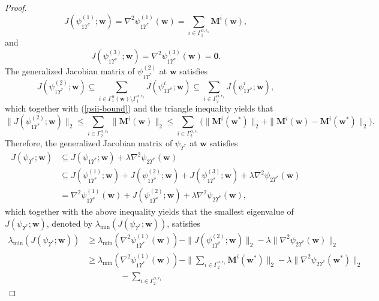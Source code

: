 \documentclass{article}
\numberwithin{equation}{section}
\begin{document}
\begin{proof}
$$J(\psi_{1\Upsilon^*}^{(1)};\mathbf{w})=\nabla^2\psi_{1\Upsilon^*}^{(1)}(\mathbf{w})=
\sum_{i\in\Gamma_1^{\alpha,\epsilon_1}}
\mathbf{M}^i(\mathbf{w}),$$ and $$ J(\psi_{1\Upsilon^*}^{(3)};\mathbf{w})=\nabla^2\psi_{1\Upsilon^*}^{(3)}(\mathbf{w})=\mathbf{0}.$$
The generalized Jacobian  matrix of $\psi_{1\Upsilon^*}^{(2)}$ at $\mathbf{w}$ satisfies
$$J(\psi_{1\Upsilon^*}^{(2)};\mathbf{w})\subseteq
\sum_{i\in\Gamma_1^{\alpha}(\mathbf{w})\setminus\Gamma_1^{\alpha,\epsilon_1}}
J(\psi_{1\Upsilon^*}^{i};\mathbf{w})\subseteq
\sum_{i\in\Gamma_2^{\alpha,\epsilon_1}}
J(\psi_{1\Upsilon^*}^{i};\mathbf{w}),$$
which together with (\ref{psii-bound}) and the triangle inequality yields that
$$\|J(\psi_{1\Upsilon^*}^{(2)};\mathbf{w})\|_2\leq
\sum_{i\in\Gamma_2^{\alpha,\epsilon_1}}
\|\mathbf{M}^i(\mathbf{w})\|_2\leq
\sum_{i\in\Gamma_2^{\alpha,\epsilon_1}}
\Big(\|\mathbf{M}^i(\mathbf{w}^{*})\|_2+\|\mathbf{M}^i(\mathbf{w})-\mathbf{M}^i(\mathbf{w}^{*})\|_2\Big).$$
Therefore, the generalized Jacobian  matrix of $\psi_{\Upsilon^*}$ at $\mathbf{w}$ satisfies
$$\begin{aligned}J(\psi_{\Upsilon^*};\mathbf{w})& \subseteq J(\psi_{1\Upsilon^*};\mathbf{w})+\lambda\nabla^2\psi_{2\Upsilon^*}(\mathbf{w})\\
	&\subseteq J(\psi_{1\Upsilon^*}^{(1)};\mathbf{w})
	+J(\psi_{1\Upsilon^*}^{(2)};\mathbf{w})
	+J(\psi_{1\Upsilon^*}^{(3)};\mathbf{w})+\lambda\nabla^2\psi_{2\Upsilon^*}(\mathbf{w})\\
	&=
	\nabla^2\psi_{1\Upsilon^*}^{(1)}(\mathbf{w})+J(\psi_{1\Upsilon^*}^{(2)};\mathbf{w})
	+\lambda\nabla^2\psi_{2\Upsilon^*}(\mathbf{w}),\end{aligned}$$
which together with the above inequality yields that the smallest eigenvalue of $J(\psi_{\Upsilon^*};\mathbf{w})$, denoted by
$\lambda_{\mathrm{min}}(J(\psi_{\Upsilon^*};\mathbf{w}))$, satisfies
\begin{equation}\label{smallest-eig-bound}\begin{aligned}
		\lambda_{\mathrm{min}}(J(\psi_{\Upsilon^*};\mathbf{w}))&\geq
		\lambda_{\mathrm{min}}(\nabla^2\psi_{1\Upsilon^*}^{(1)}(\mathbf{w}))-
		\|J(\psi_{1\Upsilon^*}^{(2)};\mathbf{w})\|_2
		-\lambda\|\nabla^2\psi_{2\Upsilon^*}(\mathbf{w})\|_2\\
		&\geq\lambda_{\mathrm{min}}(\nabla^2\psi_{1\Upsilon^*}^{(1)}(\mathbf{w}))-
		\|\sum_{i\in\Gamma_2^{\alpha,\epsilon_1}}
		\mathbf{M}^i(\mathbf{w}^*)\|_2-\lambda\|\nabla^2\psi_{2\Upsilon^*}(\mathbf{w}^*)\|_2\\
		&\qquad\qquad-\sum_{i\in\Gamma_2^{\alpha,\epsilon_1}}

\end{aligned}
\end{equation}
\end{proof}
\end{document}
